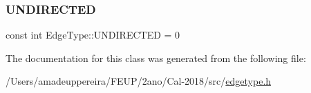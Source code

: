 \subsubsection{\texorpdfstring{U\+N\+D\+I\+R\+E\+C\+T\+ED}{UNDIRECTED}}
{\footnotesize\ttfamily const int Edge\+Type\+::\+U\+N\+D\+I\+R\+E\+C\+T\+ED = 0\hspace{0.3cm}{\ttfamily [static]}}



The documentation for this class was generated from the following file\+:\begin{DoxyCompactItemize}
\item 
/\+Users/amadeuppereira/\+F\+E\+U\+P/2ano/\+Cal-\/2018/src/\mbox{\hyperlink{edgetype_8h}{edgetype.\+h}}\end{DoxyCompactItemize}
